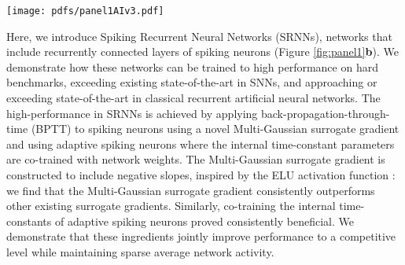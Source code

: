 \documentclass[fleqn,10pt]{wlscirep}
\begin{document}
\begin{figure*}[hbt!]
\centering
\texttt{[image: pdfs/panel1AIv3.pdf]}
\caption{\textbf{a}, Top: a classical artificial neural unit computes a weighted sum over input activations and then computes an output activation from this sum using a non-linear transfer function $f()$. Time is modeled as iterated recomputation of the network graph. Bottom: Spiking neurons receive spikes that are weighted and added to the internal state (membrane potential) that further develops through time following differential equations. When the membrane potential crosses a threshold, a spike is emitted and the potential is reset. \textbf{b}, Example architecture of a Spiking Recurrent Neural Network: an input layer projects to a layer of recurrently connected spiking neurons.  Recurrent layers then project to a read-out layer. Multiple recurrent layers can be connected in a feedforward fashion, here shown for two recurrent layers. \textbf{c}, The decaying threshold and membrane potential of the LIF and ALIF neurons can be modeled as an internal state induced by self-recurrency. \textbf{d}, Roll-out of the computational graph of a spiking neuron as used for backpropagation-through-time. \textbf{e}, Illustration of different surrogate gradient functions $\hat{f}'_s$ as a function of the neuron's membrane potential and threshold.
}
\label{fig:panel1}
\end{figure*}

Here, we introduce Spiking Recurrent Neural Networks (SRNNs), networks that include recurrently connected layers of spiking neurons (Figure \ref{fig:panel1}\textbf{b}). We demonstrate how these networks can be trained to high performance on hard benchmarks, exceeding existing state-of-the-art in SNNs, and approaching or exceeding state-of-the-art in classical recurrent artificial neural networks. The high-performance in SRNNs is achieved by applying back-propagation-through-time (BPTT)\cite{werbos1990backpropagation} to spiking neurons using a novel Multi-Gaussian surrogate gradient and using adaptive spiking neurons where the internal time-constant parameters are co-trained with network weights. The Multi-Gaussian surrogate gradient is constructed to include negative slopes, inspired by the ELU activation function \cite{clevert2015fast}: we find that the Multi-Gaussian surrogate gradient consistently outperforms other existing surrogate gradients. Similarly, co-training the internal time-constants of adaptive spiking neurons proved consistently beneficial. We demonstrate that these ingredients jointly improve performance to a competitive level while maintaining sparse average network activity. 
\end{document}
